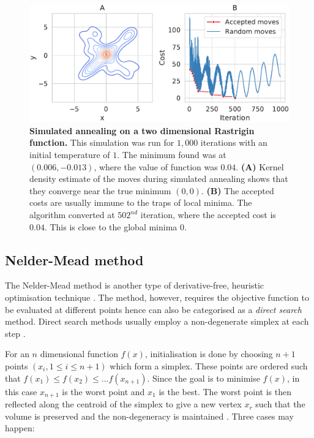 \begin{figure}[H]
\center
\includegraphics[width=1\textwidth]{chapters/Introduction/Figures/simulated_annealing.pdf}
\caption[Simulated annealing on a two dimensional Rastrigin function.]{\textbf{Simulated annealing on a two dimensional Rastrigin function.} This simulation was run for $1,000$ iterations with an initial temperature of $1$. The minimum found was at $(0.006, -0.013)$, where the value of function was $0.04$.  \textbf{(A)} Kernel density estimate of the moves during simulated annealing shows that they converge near the true minimum $(0, 0)$. \textbf{(B)} The accepted costs are usually immune to the traps of local minima. The algorithm converted at $502^{nd}$ iteration, where the accepted cost is $0.04$. This is close to the global minima $0$. }%
\label{fig:sim_anneal}
\end{figure}


\subsection{Nelder-Mead method}
The Nelder-Mead method is another type of derivative-free, heuristic optimisation technique \cite{Nelder1965-zb}. The method, however, requires the objective function to be evaluated at different points hence can also be categorised as a \textit{direct search} method. Direct search methods usually employ a non-degenerate simplex at each step \cite{lagarias1998convergence}. 


For an $n$ dimensional function $f(x)$, initialisation is done by choosing $n+1$ points $(x_i, 1\leq i \leq n+1)$ which form a simplex. These points are ordered such that $f(x_1) \leq f(x_2) \leq ... f(x_{n+1})$. Since the goal is to minimise $f(x)$, in this case $x_{n+1}$ is the worst point and $x_1$ is the best. The worst point is then reflected along the centroid of the simplex to give a new vertex $x_r$ such that the volume is preserved and the non-degeneracy is maintained \cite{presse1988numerical}. Three cases may happen:

